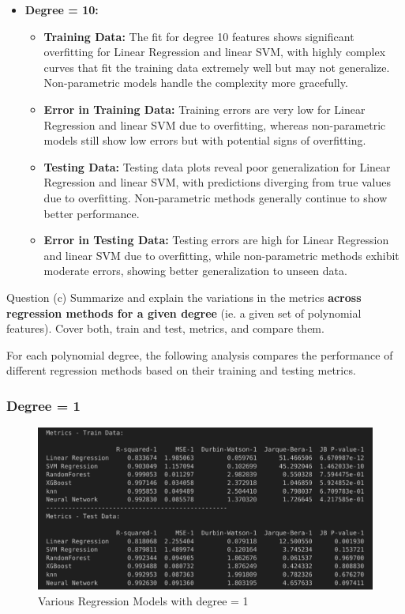 \begin{itemize}
    \item \textbf{Degree = 10:}
    \begin{itemize}
        \item \textbf{Training Data:} The fit for degree 10 features shows significant overfitting for Linear Regression and linear SVM, with highly complex curves that fit the training data extremely well but may not generalize. Non-parametric models handle the complexity more gracefully.
        \item \textbf{Error in Training Data:} Training errors are very low for Linear Regression and linear SVM due to overfitting, whereas non-parametric models still show low errors but with potential signs of overfitting.
        \item \textbf{Testing Data:} Testing data plots reveal poor generalization for Linear Regression and linear SVM, with predictions diverging from true values due to overfitting. Non-parametric methods generally continue to show better performance.
        \item \textbf{Error in Testing Data:} Testing errors are high for Linear Regression and linear SVM due to overfitting, while non-parametric methods exhibit moderate errors, showing better generalization to unseen data.
    \end{itemize}
\end{itemize}

\begin{customboxnew}[label={box:Q3c}]{Question (c)}
	Summarize and explain the variations in the metrics \textbf{across regression methods for a given degree} (ie. a given set of polynomial features). Cover both, train and test, metrics, and compare them.
\end{customboxnew}

For each polynomial degree, the following analysis compares the performance of different regression methods based on their training and testing metrics.

\subsubsection*{Degree = 1}

\begin{figure}[H]
    \centering
    \includegraphics[width=0.8\linewidth]{./Images/Error-Metrics-Degree-1.png}
    \caption{Various Regression Models with degree = 1}
\end{figure}

